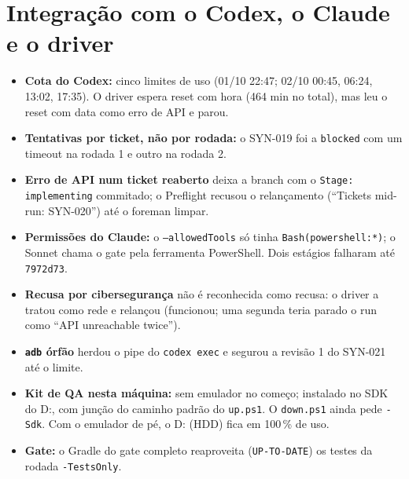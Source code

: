 \documentclass[11pt,a4paper]{article}
\begin{document}
\section{Integração com o Codex, o Claude e o driver}
\begin{itemize}
  \item \textbf{Cota do Codex:} cinco limites de uso (01/10 22:47; 02/10
        00:45, 06:24, 13:02, 17:35). O driver espera reset com hora
        (464 min no total), mas leu o reset com data como erro de API e parou.
  \item \textbf{Tentativas por ticket, não por rodada:} o SYN-019 foi a
        \texttt{blocked} com um timeout na rodada 1 e outro na rodada 2.
  \item \textbf{Erro de API num ticket reaberto} deixa a branch com o
        \texttt{Stage: implementing} commitado; o Preflight recusou o
        relançamento (``Tickets mid-run: SYN-020'') até o foreman limpar.
  \item \textbf{Permissões do Claude:} o \texttt{--allowedTools} só tinha
        \texttt{Bash(powershell:*)}; o Sonnet chama o gate pela ferramenta
        PowerShell. Dois estágios falharam até \texttt{7972d73}.
  \item \textbf{Recusa por cibersegurança} não é reconhecida como recusa: o
        driver a tratou como rede e relançou (funcionou; uma segunda teria
        parado o run como ``API unreachable twice'').
  \item \textbf{\texttt{adb} órfão} herdou o pipe do \texttt{codex exec} e
        segurou a revisão 1 do SYN-021 até o limite.
  \item \textbf{Kit de QA nesta máquina:} sem emulador no começo; instalado no
        SDK do D:, com junção do caminho padrão do \texttt{up.ps1}. O
        \texttt{down.ps1} ainda pede \texttt{-Sdk}. Com o emulador de pé, o D:
        (HDD) fica em 100\,\% de uso.
  \item \textbf{Gate:} o Gradle do gate completo reaproveita
        (\texttt{UP-TO-DATE}) os testes da rodada \texttt{-TestsOnly}.
\end{itemize}
\end{document}
